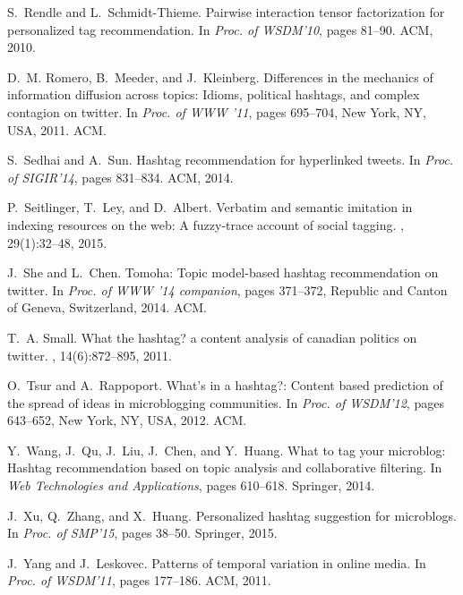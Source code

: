 \documentclass{sig-alternate-05-2015}
\begin{document}
\begin{thebibliography}{10}
S.~Rendle and L.~Schmidt-Thieme.
\newblock Pairwise interaction tensor factorization for personalized tag
  recommendation.
\newblock In {\em Proc. of WSDM'10}, pages 81--90. ACM, 2010.

D.~M. Romero, B.~Meeder, and J.~Kleinberg.
\newblock Differences in the mechanics of information diffusion across topics:
  Idioms, political hashtags, and complex contagion on twitter.
\newblock In {\em Proc. of WWW '11}, pages 695--704, New York, NY, USA, 2011.
  ACM.

S.~Sedhai and A.~Sun.
\newblock Hashtag recommendation for hyperlinked tweets.
\newblock In {\em Proc. of SIGIR'14}, pages 831--834. ACM, 2014.

P.~Seitlinger, T.~Ley, and D.~Albert.
\newblock Verbatim and semantic imitation in indexing resources on the web: A
  fuzzy-trace account of social tagging.
, 29(1):32--48, 2015.

J.~She and L.~Chen.
\newblock Tomoha: Topic model-based hashtag recommendation on twitter.
\newblock In {\em Proc. of WWW '14 companion}, pages 371--372, Republic and
  Canton of Geneva, Switzerland, 2014. ACM.

T.~A. Small.
\newblock What the hashtag? a content analysis of canadian politics on twitter.
, 14(6):872--895, 2011.

O.~Tsur and A.~Rappoport.
\newblock What's in a hashtag?: Content based prediction of the spread of ideas
  in microblogging communities.
\newblock In {\em Proc. of WSDM'12}, pages 643--652, New York, NY, USA, 2012.
  ACM.

Y.~Wang, J.~Qu, J.~Liu, J.~Chen, and Y.~Huang.
\newblock What to tag your microblog: Hashtag recommendation based on topic
  analysis and collaborative filtering.
\newblock In {\em Web Technologies and Applications}, pages 610--618. Springer,
  2014.

J.~Xu, Q.~Zhang, and X.~Huang.
\newblock Personalized hashtag suggestion for microblogs.
\newblock In {\em Proc. of SMP'15}, pages 38--50. Springer, 2015.

J.~Yang and J.~Leskovec.
\newblock Patterns of temporal variation in online media.
\newblock In {\em Proc. of WSDM'11}, pages 177--186. ACM, 2011.


\end{thebibliography}
\end{document}
